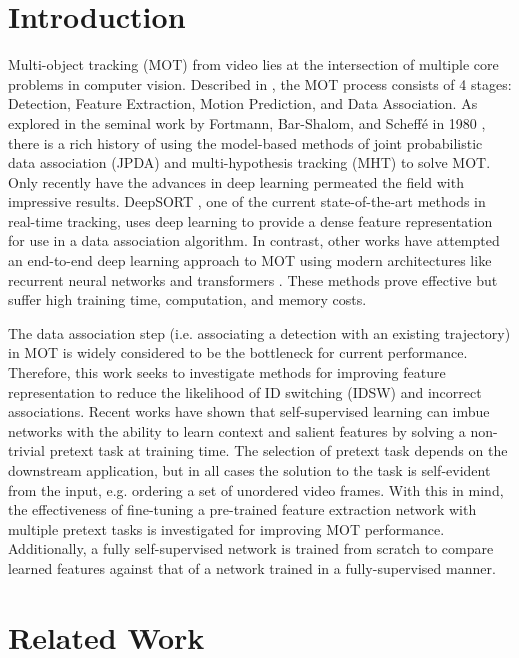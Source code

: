 \documentclass[10pt,twocolumn,letterpaper]{article}
\begin{document}
\section{Introduction}
Multi-object tracking (MOT) from video lies at the intersection of multiple core problems in computer vision. Described in \cite{Ciaparrone2020}, the MOT process consists of 4 stages: Detection, Feature Extraction, Motion Prediction, and Data Association. As explored in the seminal work by Fortmann, Bar-Shalom, and Scheffé in 1980 \cite{Fortmann1980}, there is a rich history of using the model-based methods of joint probabilistic data association (JPDA) and multi-hypothesis tracking (MHT) to solve MOT. Only recently have the advances in deep learning permeated the field with impressive results. DeepSORT \cite{Wojke2018}, one of the current state-of-the-art methods in real-time tracking, uses deep learning to provide a dense feature representation for use in a data association algorithm. In contrast, other works have attempted an end-to-end deep learning approach to MOT using modern architectures like recurrent neural networks and transformers \cite{Bastani2021, Meinhardt2021}. These methods prove effective but suffer high training time, computation, and memory costs.

The data association step (i.e. associating a detection with an existing trajectory) in MOT is widely considered to be the bottleneck for current performance. Therefore, this work seeks to investigate methods for improving feature representation to reduce the likelihood of ID switching (IDSW) and incorrect associations. Recent works have shown that self-supervised learning \cite{Jing2021} can imbue networks with the ability to learn context and salient features by solving a non-trivial pretext task at training time. The selection of pretext task depends on the downstream application, but in all cases the solution to the task is self-evident from the input, e.g. ordering a set of unordered video frames. With this in mind, the effectiveness of fine-tuning a pre-trained feature extraction network with multiple pretext tasks is investigated for improving MOT performance. Additionally, a fully self-supervised network is trained from scratch to compare learned features against that of a network trained in a fully-supervised manner.

\section{Related Work}
\end{document}

